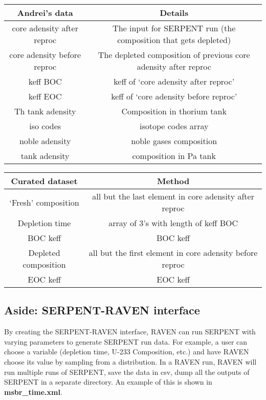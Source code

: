 \documentclass{article}
\begin{document}
\begin{table}
\begin{center}
\begin{tabular}{ c c }
    \hline
    Andrei's data & Details \\
    \hline
    core adensity after reproc & The input for SERPENT run (the composition that gets depleted) \\ 
    core adensity before reproc & The depleted composition of previous core adensity after reproc \\
    keff BOC & keff of `core adensity after reproc' \\
    keff EOC & keff of `core adensity before reproc' \\
    Th tank adensity & Composition in thorium tank \\
    iso codes & isotope codes array \\
    noble adensity & noble gases composition \\
    tank adensity & composition in Pa tank \\
    \hline
\end{tabular}
\end{center}
\label{tab:andrei}
\end{table}

\begin{table}

\begin{center}
\begin{tabular}{ c c }
    \hline
    Curated dataset & Method \\
    \hline
    `Fresh' composition & all but the last element in core adensity after reproc  \\
    Depletion time & array of 3's with length of keff BOC \\
    BOC keff & BOC keff \\
    Depleted composition & all but the first element in core adensity before reproc \\  
    EOC keff & EOC keff \\
    \hline
\end{tabular}
\label{tab:csv}
\end{center}
\end{table}


\subsection*{Aside: SERPENT-RAVEN interface}

By creating the SERPENT-RAVEN interface, RAVEN can run SERPENT
with varying parameters to generate SERPENT run data. For example,
a user can choose a variable (depletion time, U-233 Composition, etc.)
and have RAVEN choose its value by sampling from a distribution. 
In a RAVEN run, RAVEN will run multiple runs of SERPENT, save the 
data in csv, dump all the outputs of SERPENT in a separate directory.
An example of this is shown in \textbf{msbr_time.xml}.
\end{document}
